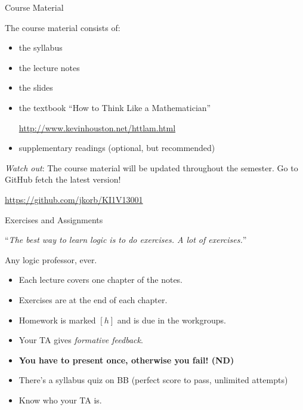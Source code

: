 \begin{frame}{Course Material}

	The course material consists of:

	\begin{itemize}[<+->]
	  \item the syllabus
	  \item the lecture notes
	  \item the slides
	  \item the textbook ``How to Think Like a Mathematician''
			\begin{center}
			  \url{http://www.kevinhouston.net/httlam.html}
			\end{center}
	  \item supplementary readings (optional, but recommended)
	\end{itemize}

	\emph{Watch out}: The course material will be updated throughout the semester. Go to GitHub fetch the latest version!

	\begin{center}
	  \url{https://github.com/jkorb/KI1V13001}
	\end{center}

\end{frame}
\begin{frame}{Exercises and Assignments}

``{\it The best way to learn logic is to do exercises. A lot of exercises.}''
\begin{flushright}
Any logic professor, ever.
\end{flushright}

	\begin{itemize}[<+->]

		\item Each lecture covers one chapter of the notes.

		\item Exercises are at the end of each chapter.

		\item Homework is marked $[h]$ and is due in the workgroups.

		\item Your TA gives \emph{formative feedback}.

		\item \textbf{You have to present once, otherwise you fail! (ND)}

		\item There's a syllabus quiz on BB (perfect score to pass, unlimited attempts)

		\item Know who your TA is.

	\end{itemize}

\end{frame}

